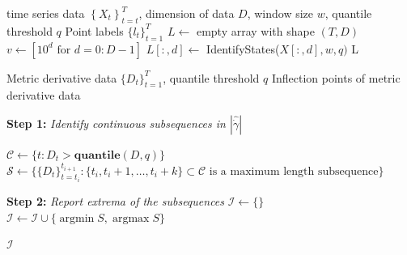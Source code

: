 \documentclass{article}
\DeclareMathOperator*{\argmax}{argmax}
\DeclareMathOperator*{\argmin}{argmin}
\begin{document}
\begin{algorithm}
\label{AlgPipeline}
\caption{Extension of the Procedure to Several Dimensions}
    \begin{algorithmic}
    \Require time series data \(\left\{X_t\right\}_{t=t}^T\), dimension of data $D$, window size $w$, quantile threshold $q$
    \Ensure Point labels $\{l_t\}_{t=1}^T$
    \State $L \gets$ empty array with shape $(T, D)$
    \State $v \gets [10^d \text{ for } d=0:D-1]$
    \State $L[:,d] \gets$ IdentifyStates($X[:,d], w, q)$
    \EndFor 
    \State \Return L
    \end{algorithmic}
\end{algorithm}
\fi

\begin{algorithm}
\label{IPIDAlg}
\caption{Change Point Detection Subroutine: Identifying Inflection Points}
\begin{algorithmic}[2]
\Require Metric derivative data $\{D_{t}\}_{t=1}^T$, quantile threshold $q$
\Ensure Inflection points of metric derivative data

\State \textbf{Step 1: } \textit{Identify continuous subsequences in \(|\hat{\dot{\gamma}}|\)}

\State \(\mathcal{C} \gets \{t : D_t > \textbf{quantile}(D,q)\}\)
\State \(\mathcal{S} \gets \{\{D_{t}\}_{t=t_i}^{t_{i + 1}} : \{t_i, t_{i}+1, \dots, t_{i} + k\}\subset \mathcal{C} \text{ is a maximum length subsequence}\}\)

\State \textbf{Step 2: } \textit{Report extrema of the subsequences}
\State \(\mathcal{I} \gets \{\}\)
    \State \(\mathcal{I} \gets \mathcal{I} \cup \{\argmin S, \argmax S\}\)
\EndFor

\State \Return \(\mathcal{I}\)
\end{algorithmic}
\end{algorithm}
\end{document}
